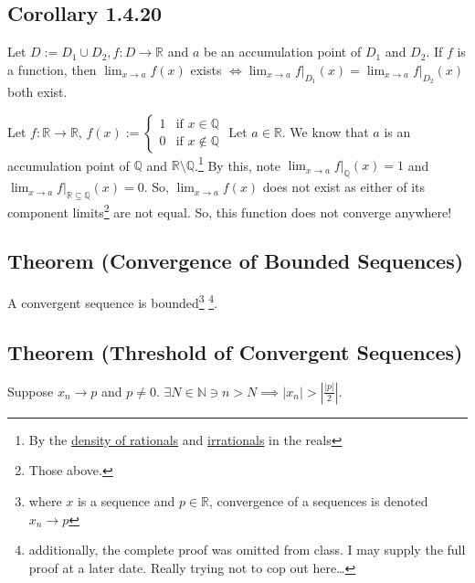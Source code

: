 \documentclass[11pt]{book}
\newcommand{\R}{\mathbb{R}}
\newcommand{\N}{\mathbb{N}}
\newcommand{\Q}{\mathbb{Q}}
\newcommand{\horline}{\noindent\rule{14.25cm}{0.6pt}\\}
\newcounter{theorem}
\begin{document}
	\subsection{Corollary 1.4.20}
	\label{subsec:cor1420}
		\begin{cor} Let $D := D_1 \cup D_2, f:D \to \R$ and $a$ be an accumulation point of $D_1$ and $D_2$. If $f$ is a function,
			then $\displaystyle\lim_{x \to a}{f(x)}$ exists $\Leftrightarrow \displaystyle\lim_{x \to a}{f\Big|_{D_1}(x)} = \displaystyle\lim_{x \to a}{f\Big|_{D_2}(x)}$ both exist.
		\end{cor}
		\begin{examp}
			Let $f:\R \to \R$, $f(x) := \begin{cases} 1 & \text{if } x \in \Q\\0 & \text{if } x \not\in \Q \end{cases}$
				Let $a \in \R$. We know that $a$ is an accumulation point of $\Q$ and $\R\setminus\Q$.\footnote{By the \hyperref[subsec:theorem116]{density of rationals} and \hyperref[subsec:theorem118]{irrationals} in the reals}
			By this, note $\displaystyle\lim_{x \to a}{f\Big|_{\Q}(x) = 1}$ and $\displaystyle\lim_{x \to a}{f\Big|_{\R\subseteq\Q}(x) = 0}$.
			So, $\displaystyle\lim_{x \to a}{f(x)}$ does not exist as either of its component limits\footnote{Those above.} are not equal.
			So, this function does not converge anywhere!
	\end{examp}
	\subsection{Theorem (Convergence of Bounded Sequences)}
		\begin{theor}
			A convergent sequence is bounded\footnote{where $x$ is a sequence and $p \in \R$, convergence of a sequences is denoted $x_n \to p$}
			\footnote{additionally, the complete proof was omitted from class. I may supply the full proof at a later date. Really trying not to
			cop out here\dots}.
		\end{theor}
	\subsection{Theorem (Threshold of Convergent Sequences)}
		\begin{theor}
			Suppose $x_n \to p$ and $p \neq 0$. $\exists N \in \N \ni n > N \implies |x_n| > |\frac{|p|}{2}|$.
		\end{theor}
	\newpage
\end{document}
